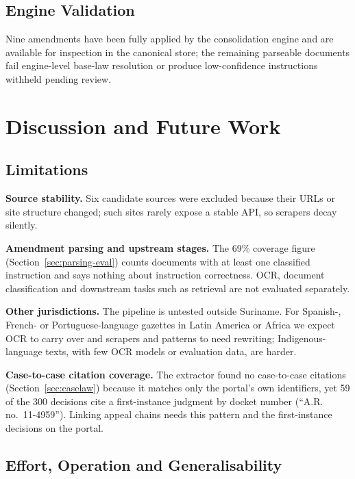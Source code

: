 \documentclass{IOS-Book-Article}
\begin{document}
\subsection{Engine Validation}

Nine amendments have been fully applied by the consolidation engine and are available for inspection in the canonical store; the remaining
parseable documents fail engine-level base-law resolution or produce low-confidence
instructions withheld pending review.

\section{Discussion and Future Work}
\label{sec:discussion}

\subsection{Limitations}
\label{sec:limitations}

\textbf{Source stability.} Six candidate sources were excluded because their URLs or site
structure changed; such sites rarely expose a stable API, so scrapers decay silently.

\textbf{Amendment parsing and upstream stages.} The 69\% coverage figure
(Section~\ref{sec:parsing-eval}) counts documents with at least one classified instruction
and says nothing about instruction correctness. OCR, document classification and
downstream tasks such as retrieval are not evaluated separately.

\textbf{Other jurisdictions.} The pipeline is untested outside Suriname. For Spanish-, French-
or Portuguese-language gazettes in Latin America or Africa we expect OCR to carry over and
scrapers and patterns to need rewriting; Indigenous-language texts, with few OCR models or
evaluation data, are harder.

\textbf{Case-to-case citation coverage.} The extractor found no case-to-case citations
(Section~\ref{sec:caselaw}) because it matches only the portal's own identifiers, yet 59 of
the 300 decisions cite a first-instance judgment by docket number (``A.R. no.~11-4959'').
Linking appeal chains needs this pattern and the first-instance decisions on the portal.

\subsection{Effort, Operation and Generalisability}
\end{document}

